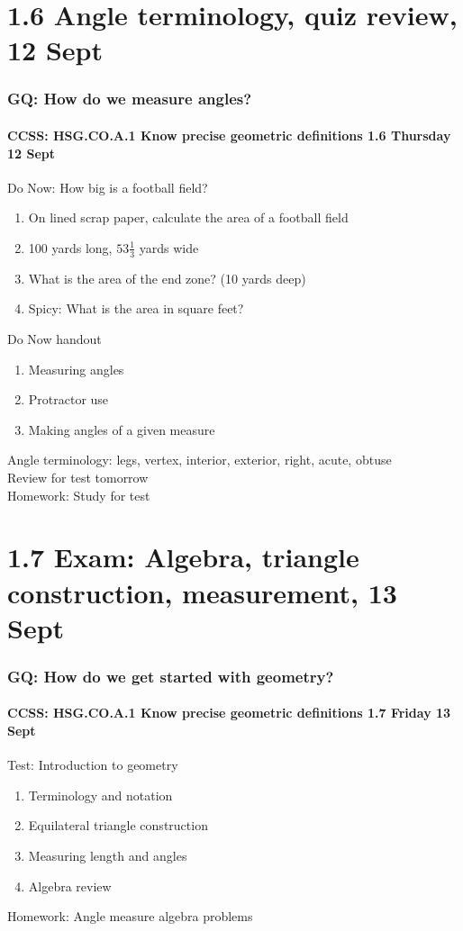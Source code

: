 \documentclass{beamer}
\begin{document}
\section{1.6 Angle terminology, quiz review, 12 Sept}
\frame
{
  \frametitle{GQ: How do we measure angles?}
  \framesubtitle{CCSS: HSG.CO.A.1 Know precise geometric definitions \hfill \alert{1.6 Thursday 12 Sept}}

  \begin{block}{Do Now: How big is a football field?}
    \begin{enumerate}
        \item On lined scrap paper, calculate the area of a football field
        \item 100 yards long, $53 \frac{1}{3}$ yards wide
        \item What is the area of the end zone? (10 yards deep)
        \item Spicy: What is the area in square feet?
    \end{enumerate}
    \end{block}

  \begin{block}{Do Now handout}
  \begin{enumerate}
      \item Measuring angles
      \item Protractor use
      \item Making angles of a given measure
  \end{enumerate}
  \end{block}
  Angle terminology: legs, vertex, interior, exterior, right, acute, obtuse\\
  Review for \alert{test tomorrow} \\
  Homework: Study for test
}

\section{1.7 Exam: Algebra, triangle construction, measurement, 13 Sept}
  \frame
  {
    \frametitle{GQ: How do we get started with geometry?}
    \framesubtitle{CCSS: HSG.CO.A.1 Know precise geometric definitions \hfill \alert{1.7 Friday 13 Sept}}

    \begin{block}{Test: Introduction to geometry}
    \begin{enumerate}
        \item Terminology and notation
        \item Equilateral triangle construction
        \item Measuring length and angles
        \item Algebra review
    \end{enumerate}
    \end{block}

    \vspace{1cm}
    Homework: Angle measure algebra problems\\
  }
\end{document}
